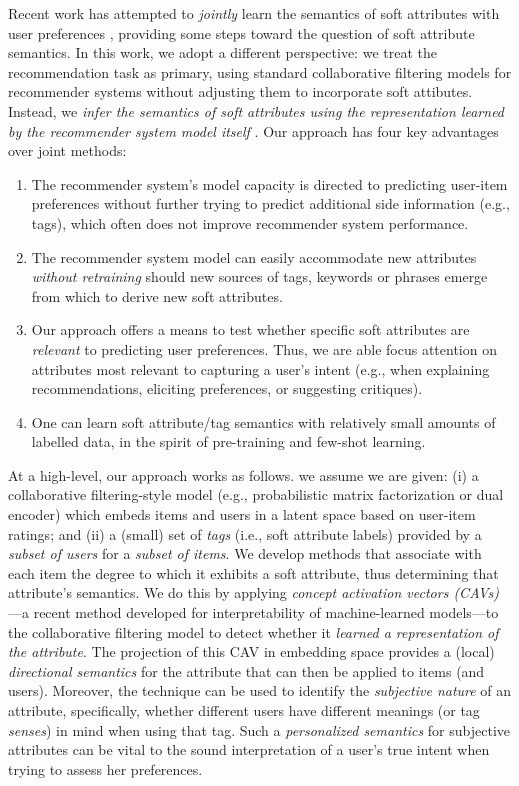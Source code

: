 \documentclass[manuscript,screen,nonacm]{acmart}
\newcommand{\1}{{\mathbf 1}}
\theoremstyle{TheoremNum}
\begin{document}
 Recent work has attempted to \emph{jointly} learn the semantics of soft attributes with user preferences \cite{wu2019deep,luo2020latent,nema2021untangle}, providing some steps toward the question of soft attribute semantics. 
 In this work, we adopt a different perspective: we treat the recommendation task as primary, using standard collaborative filtering models
 for recommender systems without adjusting them to incorporate soft attibutes. Instead, we \emph{infer the semantics of soft attributes using the representation learned by the recommender system model itself} \cite{rendle2010,cohen:recsys2017}.
Our approach has four key advantages over joint methods:
\begin{enumerate}[(1)]
\item The recommender system's model capacity is directed to predicting user-item preferences without further trying to predict additional side information (e.g., tags), which often does not improve recommender system performance.
\item The recommender system model can easily accommodate new attributes \emph{without retraining} should new sources of tags, keywords or phrases emerge from which to derive new soft attributes. 
\item Our approach offers a means to test whether specific soft attributes are \emph{relevant} to predicting user preferences. Thus, we are able focus attention on attributes most relevant to capturing a user's intent (e.g., when explaining recommendations, eliciting preferences, or suggesting critiques).
\item One can learn soft attribute/tag semantics with relatively small amounts of labelled data, in the spirit of pre-training and few-shot learning.
\end{enumerate}
 
At a high-level, our approach works as follows. we assume we are given: (i) a collaborative filtering-style model (e.g., probabilistic matrix factorization or dual encoder) which embeds items and users in a latent space based on user-item ratings; and (ii) a (small) set of \emph{tags} (i.e., soft attribute labels) provided by a \emph{subset of users} for a \emph{subset of items}. We develop methods that associate with each item the degree to which it exhibits a soft attribute, thus determining that attribute's semantics. We do this by applying \emph{concept activation vectors (CAVs)} \cite{kimTCAV:icml18}---a recent method developed for interpretability of machine-learned models---to the collaborative filtering model to detect whether it \emph{learned a representation of the attribute}. The projection of this CAV in embedding space provides a (local) \emph{directional semantics} for the attribute that can then be applied to items (and users). Moreover, the technique can be used to identify the \emph{subjective nature} of an attribute, specifically, whether different users have different meanings (or tag \emph{senses}) in mind when using that tag. Such a \emph{personalized semantics} for subjective attributes can be vital to the sound interpretation of a user's true intent when trying to assess her preferences.
 
\end{document}
